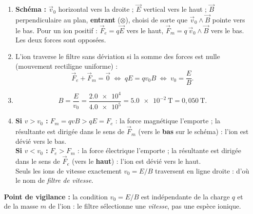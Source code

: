 \documentclass[11pt]{article}
\begin{document}
\begin{corrige}
\begin{enumerate}
\item \textbf{Schéma :} $\vec{v}_0$ horizontal vers la droite ; $\vec{E}$ vertical vers le haut ; $\vec{B}$ perpendiculaire au plan, \textbf{entrant} ($\otimes$), choisi de sorte que $\vec{v}_0\wedge\vec{B}$ pointe vers le bas. Pour un ion positif : $\vec{F}_e = q\vec{E}$ vers le haut, $\vec{F}_m = q\,\vec{v}_0\wedge\vec{B}$ vers le bas. Les deux forces sont opposées.
\item L'ion traverse le filtre sans déviation si la somme des forces est nulle (mouvement rectiligne uniforme) :
\[
\vec{F}_e + \vec{F}_m = \vec{0} \;\Longleftrightarrow\; qE = qv_0B \;\Longleftrightarrow\; \boxed{v_0 = \frac{E}{B}}.
\]
\item \[
B = \frac{E}{v_0} = \frac{\num{2,0e4}}{\num{4,0e5}} = \num{5,0e-2}~\mathrm{T} = 0,050~\mathrm{T}.
\]
\item \textbf{Si $v > v_0$ :} $F_m = qvB > qE = F_e$ : la force magnétique l'emporte ; la résultante est dirigée dans le sens de $\vec{F}_m$ (vers le \textbf{bas} sur le schéma) : l'ion est dévié vers le bas.\\
\textbf{Si $v < v_0$ :} $F_e > F_m$ : la force électrique l'emporte ; la résultante est dirigée dans le sens de $\vec{F}_e$ (vers le \textbf{haut}) : l'ion est dévié vers le haut.\\
Seuls les ions de vitesse exactement $v_0 = E/B$ traversent en ligne droite : d'où le nom de \emph{filtre de vitesse}.
\end{enumerate}
\textbf{Point de vigilance :} la condition $v_0 = E/B$ est indépendante de la charge $q$ et de la masse $m$ de l'ion : le filtre sélectionne une \emph{vitesse}, pas une espèce ionique.
\end{corrige}
\end{document}
